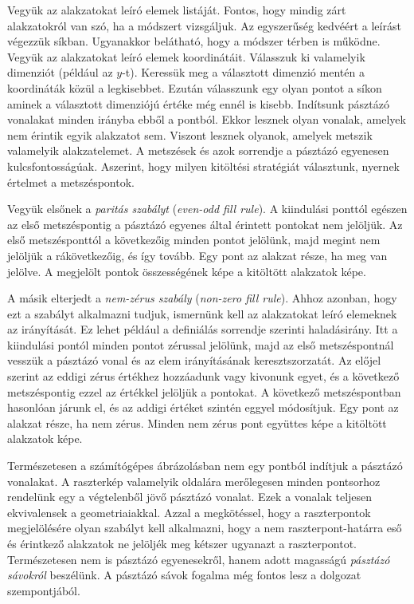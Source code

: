 \documentclass[12pt]{report}
\theoremstyle{definition}
\newcommand{\inenglish}[1]{\textsl{#1}}
\begin{document}
Vegyük az alakzatokat leíró elemek listáját. Fontos, hogy mindig zárt
alakzatokról van szó, ha a módszert vizsgáljuk. Az egyszerűség kedvéért a
leírást végezzük síkban. Ugyanakkor belátható, hogy a módszer térben is
működne. Vegyük az alakzatokat leíró elemek koordinátáit. Válasszuk ki
valamelyik dimenziót (például az $y$-t). Keressük meg a választott dimenzió
mentén a koordináták közül a legkisebbet. Ezután válasszunk egy olyan pontot a
síkon aminek a választott dimenziójú értéke még ennél is kisebb. Indítsunk
pásztázó vonalakat minden irányba ebből a pontból. Ekkor lesznek olyan vonalak,
amelyek nem érintik egyik alakzatot sem. Viszont lesznek olyanok, amelyek
metszik valamelyik alakzatelemet. A metszések és azok sorrendje a pásztázó
egyenesen kulcsfontosságúak. Aszerint, hogy milyen kitöltési stratégiát
választunk, nyernek értelmet a metszéspontok.

Vegyük elsőnek a \emph{paritás szabályt} (\inenglish{even-odd fill rule}). A
kiindulási ponttól egészen az első metszéspontig a pásztázó egyenes által
érintett pontokat nem jelöljük. Az első metszésponttól a következőig minden
pontot jelölünk, majd megint nem jelöljük a rákövetkezőig, és így tovább. Egy
pont az alakzat része, ha meg van jelölve. A megjelölt pontok összességének
képe a kitöltött alakzatok képe.

A másik elterjedt a \emph{nem-zérus szabály} (\inenglish{non-zero fill rule}).
Ahhoz azonban, hogy ezt a szabályt alkalmazni tudjuk, ismernünk kell az
alakzatokat leíró elemeknek az irányítását. Ez lehet például a definiálás
sorrendje szerinti haladásirány. Itt a kiindulási pontól minden pontot zérussal
jelölünk, majd az első metszéspontnál vesszük a pásztázó vonal és az elem
irányításának keresztszorzatát. Az előjel szerint az eddigi zérus értékhez
hozzáadunk vagy kivonunk egyet, és a következő metszéspontig ezzel az értékkel
jelöljük a pontokat. A következő metszéspontban hasonlóan járunk el, és az
addigi értéket szintén eggyel módosítjuk. Egy pont az alakzat része, ha nem
zérus. Minden nem zérus pont együttes képe a kitöltött alakzatok képe.

Természetesen a számítógépes ábrázolásban nem egy pontból indítjuk a pásztázó
vonalakat. A raszterkép valamelyik oldalára merőlegesen minden pontsorhoz
rendelünk egy a végtelenből jövő pásztázó vonalat. Ezek a vonalak teljesen
ekvivalensek a geometriaiakkal. Azzal a megkötéssel, hogy a raszterpontok
megjelölésére olyan szabályt kell alkalmazni, hogy a nem raszterpont-határra
eső és érintkező alakzatok ne jelöljék meg kétszer ugyanazt a raszterpontot.
Természetesen nem is pásztázó egyenesekről, hanem adott magasságú
\emph{pásztázó sávokról} beszélünk. A pásztázó sávok fogalma még fontos lesz a
dolgozat szempontjából.
\end{document}
